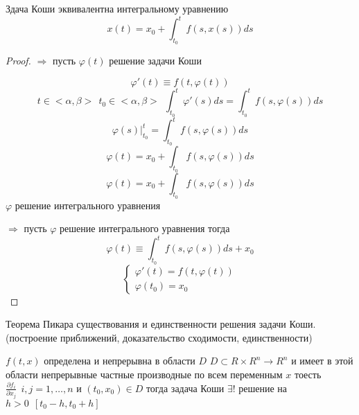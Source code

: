 \begin{block}[Лемма]
  Здача Коши эквивалентна интегральному уравнению
  $$
  x(t) = x_0 + \int_{t_0}^t f(s, x(s))ds
  $$
\end{block}

\begin{proof}
  $\Rightarrow$ пусть $\varphi(t)$ решение задачи Коши

  $$
  \varphi'(t) \equiv f(t, \varphi(t))
  $$
  $$
  t \in <\alpha, \beta> ~~ t_0 \in <\alpha, \beta> ~~ \int_{t_0}^t
  \varphi'(s)ds = \int_{t_0}^tf(s, \varphi(s))ds
  $$
  $$
  \varphi(s)|_{t_0}^t = \int_{t_0}^t f(s, \varphi(s))ds
  $$
  $$
  \varphi(t) = x_0 + \int_{t_0} f(s, \varphi(s))ds
  $$
  $$
  \varphi(t) = x_0  + \int_{t_0} f(s, \varphi(s))ds
  $$
  $\varphi$ решение интегрального уравнения

  $\Rightarrow$ пусть $\varphi$ решение интегрального уравнения тогда
  $$
  \varphi(t) \equiv \int_{t_0}^t f(s, \varphi(s))ds + x_0
  $$
  $$
  \left\{
  \begin{array}{l}
    \varphi'(t) = f(t, \varphi(t)) \\
    \varphi(t_0) = x_0
  \end{array}
  \right.
  $$
\end{proof}

\begin{title}[\Large]
  Теорема Пикара существования и единственности решения задачи Коши.
  (построение приближений, доказательство сходимости, единственности)
\end{title}

\begin{theorem}
  $f(t, x)$ определена и непрерывна в области $D$ $D\subset R \times R^n \to
  R^n$ и имеет в этой области непрерывные частные производные по всем переменным
  $x$ тоесть $\frac{\partial f_i}{\partial x_j} ~~ i,j = 1, \ldots, n$ и
  $(t_0, x_0) \in D$ тогда задача Коши $\exists!$ решение
  на $h > 0 ~~ [t_0 - h, t_0 + h]$
\end{theorem}

